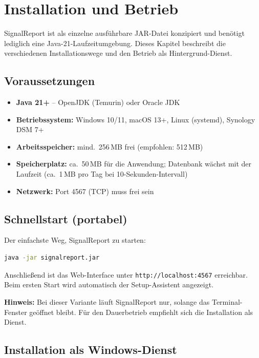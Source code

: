 \section{Installation und Betrieb}
\label{sec:installation}

SignalReport ist als einzelne ausführbare JAR-Datei konzipiert und benötigt lediglich
eine Java-21-Laufzeitumgebung. Dieses Kapitel beschreibt die verschiedenen
Installationswege und den Betrieb als Hintergrund-Dienst.

\subsection{Voraussetzungen}

\begin{itemize}
  \item \textbf{Java 21+} -- OpenJDK (Temurin) oder Oracle JDK
  \item \textbf{Betriebssystem:} Windows 10/11, macOS 13+, Linux (systemd), Synology DSM 7+
  \item \textbf{Arbeitsspeicher:} mind.\ 256\,MB frei (empfohlen: 512\,MB)
  \item \textbf{Speicherplatz:} ca.\ 50\,MB für die Anwendung; Datenbank wächst mit der
    Laufzeit (ca.\ 1\,MB pro Tag bei 10-Sekunden-Intervall)
  \item \textbf{Netzwerk:} Port 4567 (TCP) muss frei sein
\end{itemize}

\subsection{Schnellstart (portabel)}

Der einfachste Weg, SignalReport zu starten:

\begin{lstlisting}[language=bash, caption={Portabler Start}]
java -jar signalreport.jar
\end{lstlisting}

Anschließend ist das Web-Interface unter \texttt{http://localhost:4567} erreichbar.
Beim ersten Start wird automatisch der Setup-Assistent angezeigt.

\textbf{Hinweis:} Bei dieser Variante läuft SignalReport nur, solange das Terminal-Fenster
geöffnet bleibt. Für den Dauerbetrieb empfiehlt sich die Installation als Dienst.

\subsection{Installation als Windows-Dienst}
\label{subsec:install-windows}

